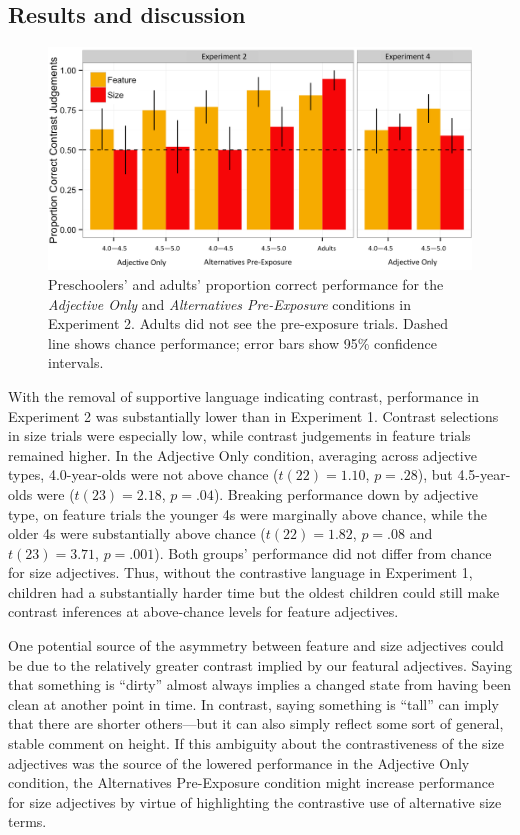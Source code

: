 \documentclass[man]{apa2}
\begin{document}
\subsection{Results and discussion}

\begin{figure}[t] 
  \begin{center} 
    \includegraphics[width=5.5in]{figures/expts2And4.png} 
    \caption{\label{fig:expt2_kidsAdults} Preschoolers' and adults' proportion correct performance for the \emph{Adjective Only} and \emph{Alternatives Pre-Exposure} conditions in Experiment 2. Adults did not see the pre-exposure trials. Dashed line shows chance performance; error bars show 95\% confidence intervals.}
  \end{center} 
  \vspace{-10ex} 
\end{figure}

With the removal of supportive language indicating contrast, performance in Experiment 2 was substantially lower than in Experiment 1. Contrast selections in size trials were especially low, while contrast judgements in feature trials remained higher. In the Adjective Only condition, averaging across adjective types, 4.0-year-olds were not above chance ($t(22) = 1.10$, $p = .28$), but 4.5-year-olds were ($t(23)=2.18$, $p = .04$). Breaking performance down by adjective type, on feature trials the younger 4s were marginally above chance, while the older 4s were substantially above chance ($t(22) = 1.82$, $p = .08$ and $t(23)=3.71$, $p = .001$). Both groups' performance did not differ from chance for size adjectives. Thus, without the contrastive language in Experiment 1, children had a substantially harder time but the oldest children could still make contrast inferences at above-chance levels for feature adjectives. 

One potential source of the asymmetry between feature and size adjectives could be due to the relatively greater contrast implied by our featural adjectives. Saying that something is ``dirty'' almost always implies a changed state from having been clean at another point in time. In contrast, saying something is ``tall'' can imply that there are shorter others---but it can also simply reflect some sort of general, stable comment on height. If this ambiguity about the contrastiveness of the size adjectives was the source of the lowered performance in the Adjective Only condition, the Alternatives Pre-Exposure condition might increase performance for size adjectives by virtue of highlighting the contrastive use of alternative size terms. 
\end{document}
